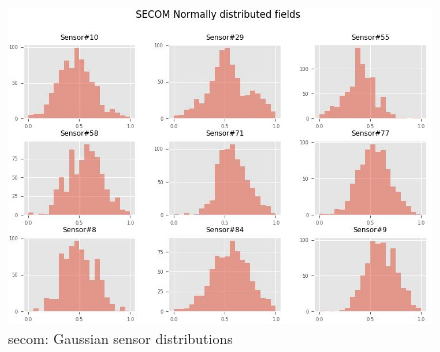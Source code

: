 \documentclass[english, a4paper]{report}
\begin{document}
{{{            \begin{figure}[H]
                \centering
                \includegraphics[width=\textwidth]{anom-SECOM-norm-fields}
                \caption{\gls{secom}: Gaussian sensor distributions}
                \label{fig:secomNormalDists}
            \end{figure}
              
}}}
\end{document}
